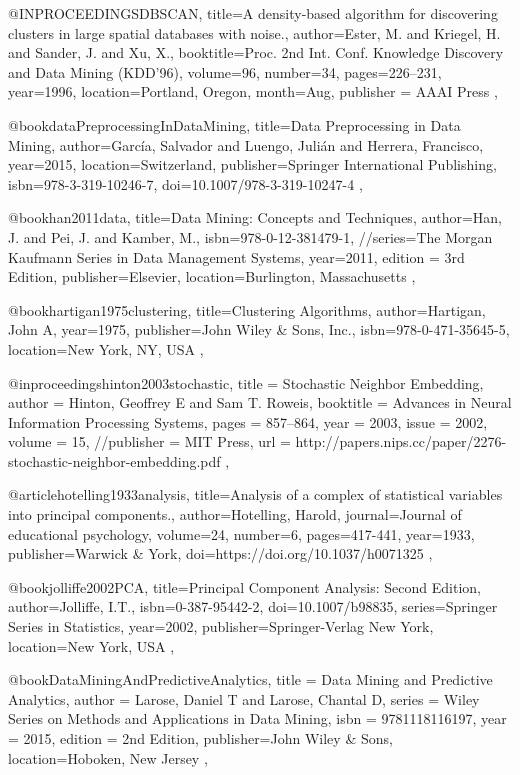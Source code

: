 @INPROCEEDINGS{DBSCAN,
  title={A density-based algorithm for discovering clusters in large spatial databases with noise.},
  author={Ester, M. and Kriegel, H. and Sander, J. and Xu, X.},
  booktitle={Proc. 2nd Int. Conf. Knowledge Discovery and Data Mining (KDD’96)},
  volume={96},
  number={34},
  pages={226--231},
  year={1996},
  location={Portland, Oregon},
  month={Aug},
  publisher = {AAAI Press}
},


@book{dataPreprocessingInDataMining,
  title={Data Preprocessing in Data Mining},
  author={García, Salvador and Luengo, Julián and Herrera, Francisco},
  year={2015},
  location={Switzerland},
  publisher={Springer International Publishing},
  isbn={978-3-319-10246-7},
  doi={10.1007/978-3-319-10247-4}
},

@book{han2011data,
  title={Data Mining: Concepts and Techniques},
  author={Han, J. and Pei, J. and Kamber, M.},
  isbn={978-0-12-381479-1},
  //series={The Morgan Kaufmann Series in Data Management Systems},
  year={2011},
  edition = {3rd Edition},
  publisher={Elsevier},
  location={Burlington, Massachusetts}
},

@book{hartigan1975clustering,
  title={Clustering Algorithms},
  author={Hartigan, John A},
  year={1975},
  publisher={John Wiley \& Sons, Inc.},
  isbn={978-0-471-35645-5},
  location={New York, NY, USA}
},

@inproceedings{hinton2003stochastic,
  title = {Stochastic Neighbor Embedding},
  author = {Hinton, Geoffrey E and Sam T. Roweis},
  booktitle = {Advances in Neural Information Processing Systems},
  pages = {857--864},
  year = {2003},
  issue = {2002},
  volume = {15},
  //publisher = {MIT Press},
  url = {http://papers.nips.cc/paper/2276-stochastic-neighbor-embedding.pdf}
},

@article{hotelling1933analysis,
  title={Analysis of a complex of statistical variables into principal components.},
  author={Hotelling, Harold},
  journal={Journal of educational psychology},
  volume={24},
  number={6},
  pages={417-441},
  year={1933},
  publisher={Warwick \& York},
  doi={https://doi.org/10.1037/h0071325}
},

@book{jolliffe2002PCA,
  title={Principal Component Analysis: Second Edition},
  author={Jolliffe, I.T.},
  isbn={0-387-95442-2},
  doi={10.1007/b98835},
  series={Springer Series in Statistics},
  year={2002},
  publisher={Springer-Verlag New York},
  location={New York, USA}
},

@book{DataMiningAndPredictiveAnalytics,
  title = {Data Mining and Predictive Analytics},
  author = {Larose, Daniel T and Larose, Chantal D},
  series = {Wiley Series on Methods and Applications in Data Mining},
  isbn = {9781118116197},
  year = {2015},
  edition = {2nd Edition},
  publisher={John Wiley \& Sons},
  location={Hoboken, New Jersey}
},

